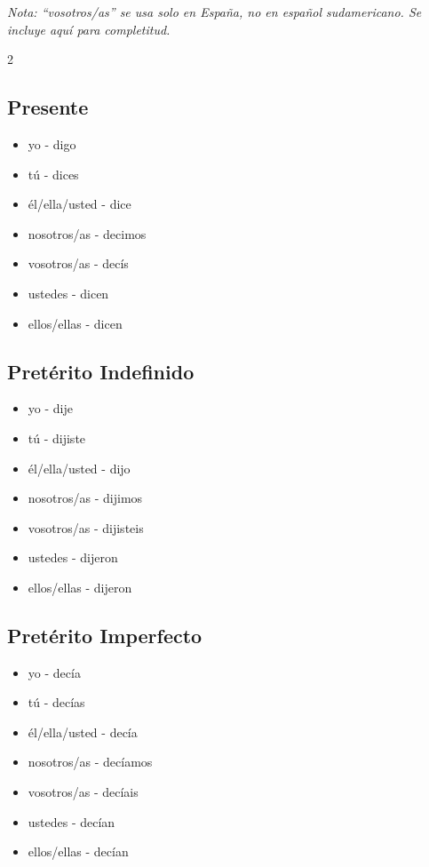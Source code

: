 \documentclass[12pt,a4paper]{article}
\begin{document}
\textit{Nota: \enquote{vosotros/as} se usa solo en España, no en español sudamericano. Se incluye aquí para completitud.}

\begin{multicols}{2}

\subsection*{Presente}
\begin{itemize}[leftmargin=*]
    \item yo - digo
    \item tú - dices
    \item él/ella/usted - dice
    \item nosotros/as - decimos
    \item vosotros/as - decís
    \item ustedes - dicen
    \item ellos/ellas - dicen
\end{itemize}

\subsection*{Pretérito Indefinido}
\begin{itemize}[leftmargin=*]
    \item yo - dije
    \item tú - dijiste
    \item él/ella/usted - dijo
    \item nosotros/as - dijimos
    \item vosotros/as - dijisteis
    \item ustedes - dijeron
    \item ellos/ellas - dijeron
\end{itemize}

\subsection*{Pretérito Imperfecto}
\begin{itemize}[leftmargin=*]
    \item yo - decía
    \item tú - decías
    \item él/ella/usted - decía
    \item nosotros/as - decíamos
    \item vosotros/as - decíais
    \item ustedes - decían
    \item ellos/ellas - decían
\end{itemize}


\end{multicols}
\end{document}
